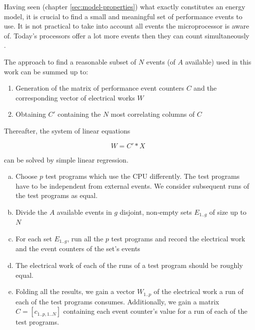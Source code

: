 Having seen (chapter \ref{sec:model-properties}) what exactly constitutes an
energy model, it is crucial to find a small and meaningful set of performance
events to use. It is not practical to take into account all events the
microprocessor is aware of. Today's processors offer a lot more events then they
can count simultaneously \cite{intel2011softdev1}.

The approach to find a reasonable subset of $N$ events (of $A$ available) used
in this work can be summed up to:

\begin{enumerate}

\item Generation of the matrix of performance event counters $C$ and
the corresponding vector of electrical works $W$

\item Obtaining $C'$ containing the $N$ most correlating columns of $C$

\end{enumerate}

Thereafter, the system of linear equations

\begin{equation}
W = C' * X
\end{equation}

can be solved by simple linear regression.



\begin{enumerate}[(a)]

\item Choose $p$ test programs which use the CPU differently. The test
programs have to be independent from external events. We consider subsequent
runs of the test programs as equal.

\item Divide the $A$ available events in $g$ disjoint, non-empty sets $E_{1..g}$
of size up to $N$

\item For each set $E_{1..g}$, run all the $p$ test programs and record the
electrical work and the event counters of the set's events

\item The electrical work of each of the runs of a test program should be
roughly equal.

\item Folding all the results, we gain a vector $W_{1..p}$ of the electrical
work a run of each of the test programs consumes. Additionally, we gain a matrix
$C = [c_{1..p,1..N}]$ containing each event counter's value for a run of each of
the test programs.

\end{enumerate}

